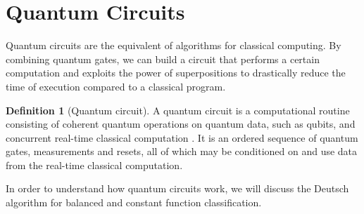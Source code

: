 \documentclass[12pt,a4paper]{report}
\theoremstyle{definition}
\newtheorem{definition}{Definition}[section]
\theoremstyle{definition}
\theoremstyle{definition}
\begin{document}
\section{Quantum Circuits}
Quantum circuits are the equivalent of algorithms for classical computing. By combining quantum gates, we can build a circuit that performs a certain computation and exploits the power of superpositions to drastically reduce the time of execution compared to a classical program.
\begin{definition}[Quantum circuit]
A quantum circuit is a computational routine consisting of coherent quantum operations on quantum data, such as qubits, and concurrent real-time classical computation \cite{qsk}. It is an ordered sequence of quantum gates, measurements and resets, all of which may be conditioned on and use data from the real-time classical computation.
\end{definition}
In order to understand how quantum circuits work, we will discuss the Deutsch algorithm for balanced and constant function classification.
\end{document}
